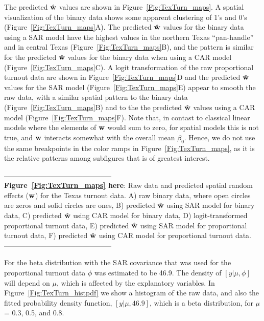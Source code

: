 \documentclass[12pt, titlepage]{article}
\begin{document}
The predicted $\hat{\mathbf{w}}$ values are shown in Figure~\ref{Fig:TexTurn_maps}.  A spatial visualization of the binary data shows some apparent clustering of 1's and 0's (Figure~\ref{Fig:TexTurn_maps}A).  The predicted $\hat{\mathbf{w}}$ values for the binary data using a SAR model have the highest values in the northern Texas ``pan-handle'' and in central Texas (Figure~\ref{Fig:TexTurn_maps}B), and the pattern is similar for the predicted $\hat{\mathbf{w}}$ values for the binary data when using a CAR model (Figure~\ref{Fig:TexTurn_maps}C).  A logit transformation of the raw proportional turnout data are shown in Figure~\ref{Fig:TexTurn_maps}D and the predicted $\hat{\mathbf{w}}$ values for the SAR model (Figure~\ref{Fig:TexTurn_maps}E) appear to smooth the raw data, with a similar spatial pattern to the binary data (Figure~\ref{Fig:TexTurn_maps}B) and to the the predicted $\hat{\mathbf{w}}$ values using a CAR model (Figure~\ref{Fig:TexTurn_maps}F).  Note that, in contast to classical linear models where the elements of $\mathbf{w}$ would sum to zero, for spatial models this is not true, and $\mathbf{w}$ interacts somewhat with the overall mean $\beta_{0}$.  Hence, we do not use the same breakpoints in the color ramps in Figure~\ref{Fig:TexTurn_maps}, as it is the relative patterns among subfigures that is of greatest interest.

\begin{spacing}{0.8}
\vspace{.4cm}
\noindent --------------------------------------------- \\
\textbf{Figure~\ref{Fig:TexTurn_maps} here}: Raw data and predicted spatial random effects ($\mathbf{w}$) for the Texas turnout data. A) raw binary data, where open circles are zeros and solid circles are ones, B) predicted $\hat{\mathbf{w}}$ using SAR model for binary data, C) predicted $\hat{\mathbf{w}}$ using CAR model for binary data, D) logit-transformed proportional turnout data, E) predicted $\hat{\mathbf{w}}$ using SAR model for proportional turnout data, F) predicted $\hat{\mathbf{w}}$ using CAR model for proportional turnout data. \\
--------------------------------------------- \\ 
\end{spacing}

For the beta distribution with the SAR covariance that was used for the proportional turnout data $\phi$ was estimated to be 46.9. The density of $[y|\mu,\phi]$ will depend on $\mu$, which is affected by the explanatory variables.  In Figure~\ref{Fig:TexTurn_histpdf} we show a histogram of the raw data, and also the fitted probability density function, $[y|\mu, 46.9]$, which is a beta distribution, for $\mu$ = 0.3, 0.5, and 0.8.  
\end{document}
